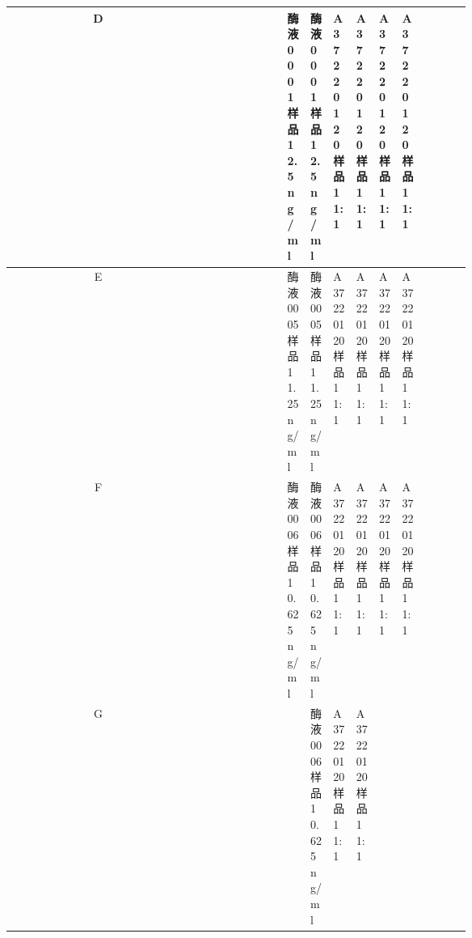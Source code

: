\documentclass[UTF8,10pt,a4paper,fontset=fandol]{ctexart}
\begin{document}
\begin{center}
\begin{tabular}{c|*{12}{p{0.055\linewidth}|}}
D & & & & &
\shortstack{酶液0001\\样品1\\2.5 ng/ml} &
\shortstack{酶液0001\\样品1\\2.5 ng/ml} &
\shortstack{A37220120\\样品1\\1:1} &
\shortstack{A37220120\\样品1\\1:1} &
\shortstack{A37220120\\样品1\\1:1} &
\shortstack{A37220120\\样品1\\1:1} & & \\ \hline
E & & & & &
\shortstack{酶液0005\\样品1\\1.25 ng/ml} &
\shortstack{酶液0005\\样品1\\1.25 ng/ml} &
\shortstack{A37220120\\样品1\\1:1} &
\shortstack{A37220120\\样品1\\1:1} &
\shortstack{A37220120\\样品1\\1:1} &
\shortstack{A37220120\\样品1\\1:1} & & \\ \hline
F & & & & &
\shortstack{酶液0006\\样品1\\0.625 ng/ml} &
\shortstack{酶液0006\\样品1\\0.625 ng/ml} &
\shortstack{A37220120\\样品1\\1:1} &
\shortstack{A37220120\\样品1\\1:1} &
\shortstack{A37220120\\样品1\\1:1} &
\shortstack{A37220120\\样品1\\1:1} & & \\ \hline
G & & & & & &
\shortstack{酶液0006\\样品1\\0.625 ng/ml} &
\shortstack{A37220120\\样品1\\1:1} &
\shortstack{A37220120\\样品1\\1:1} & & & & \\ \hline

\end{tabular}
\end{center}
\end{document}
